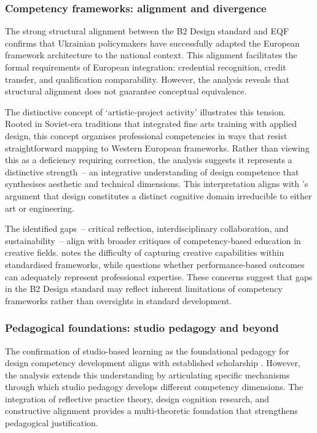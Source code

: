 \documentclass[ed]{acnsart}
\begin{document}
	\subsubsection{Competency frameworks: alignment and divergence}
	
	The strong structural alignment between the B2 Design standard and EQF confirms that Ukrainian policymakers have successfully adapted the European framework architecture to the national context. This alignment facilitates the formal requirements of European integration: credential recognition, credit transfer, and qualification comparability. However, the analysis reveals that structural alignment does not guarantee conceptual equivalence.
	
	The distinctive concept of `artistic-project activity' illustrates this tension. Rooted in Soviet-era traditions that integrated fine arts training with applied design, this concept organises professional competencies in ways that resist straightforward mapping to Western European frameworks. Rather than viewing this as a deficiency requiring correction, the analysis suggests it represents a distinctive strength~-- an integrative understanding of design competence that synthesises aesthetic and technical dimensions. This interpretation aligns with \citeauthor{Cross2011}'s \cite{Cross2011} argument that design constitutes a distinct cognitive domain irreducible to either art or engineering.
	
	The identified gaps~-- critical reflection, interdisciplinary collaboration, and sustainability~-- align with broader critiques of competency-based education in creative fields. \citet{Weldon2009168} notes the difficulty of capturing creative capabilities within standardised frameworks, while \citet{Brockmann200899} questions whether performance-based outcomes can adequately represent professional expertise. These concerns suggest that gaps in the B2 Design standard may reflect inherent limitations of competency frameworks rather than oversights in standard development.
	
	\subsubsection{Pedagogical foundations: studio pedagogy and beyond}
	
	The confirmation of studio-based learning as the foundational pedagogy for design competency development aligns with established scholarship \cite{Schon1983, Goldschmidt2010285}. However, the analysis extends this understanding by articulating specific mechanisms through which studio pedagogy develops different competency dimensions. The integration of reflective practice theory, design cognition research, and constructive alignment provides a multi-theoretic foundation that strengthens pedagogical justification.
	
\end{document}
